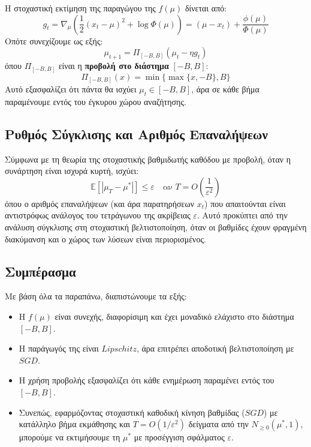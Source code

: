 \documentclass[12pt]{article}
\begin{document}
Η στοχαστική εκτίμηση της παραγώγου της $f(\mu)$ δίνεται από:
\[
g_t = \nabla_\mu \left( \frac{1}{2}(x_t - \mu)^2 + \log \Phi(\mu) \right) = (\mu - x_t) + \frac{\phi(\mu)}{\Phi(\mu)}
\]
Οπότε συνεχίζουμε ως εξής:
\[
\mu_{t+1} = \Pi_{[-B,B]}\left( \mu_t - \eta g_t \right)
\]
όπου $\Pi_{[-B,B]}$ είναι η \textbf{προβολή στο διάστημα} $[-B, B]$:
\[
\Pi_{[-B,B]}(x) = \min\{\max\{x, -B\}, B\}
\]
Αυτό εξασφαλίζει ότι πάντα θα ισχύει $\mu_t \in [-B,B]$, άρα σε κάθε βήμα παραμένουμε εντός του έγκυρου χώρου αναζήτησης.

\subsection*{Ρυθμός Σύγκλισης και Αριθμός Επαναλήψεων}

Σύμφωνα με τη θεωρία της στοχαστικής βαθμιδωτής καθόδου με προβολή, όταν η συνάρτηση είναι ισχυρά κυρτή, ισχύει: 
\[
\mathbb{E}[|\mu_T - \mu^*|] \leq \varepsilon \quad \text{αν } T = O\left( \frac{1}{\varepsilon^2} \right)
\]
όπου ο αριθμός επαναλήψεων (και άρα παρατηρήσεων $x_t$) που απαιτούνται είναι αντιστρόφως ανάλογος του τετράγωνου της ακρίβειας $\varepsilon$. Αυτό προκύπτει από την ανάλυση σύγκλισης στη στοχαστική βελτιστοποίηση, όταν οι βαθμίδες έχουν φραγμένη διακύμανση και ο χώρος των λύσεων είναι περιορισμένος.

\subsection*{Συμπέρασμα}

Με βάση όλα τα παραπάνω, διαπιστώνουμε τα εξής:
\begin{itemize}
  \item Η $f(\mu)$ είναι συνεχής, διαφορίσιμη και έχει μοναδικό ελάχιστο στο διάστημα $[-B,B]$.
  \item Η παράγωγός της είναι $Lipschitz$, άρα επιτρέπει αποδοτική βελτιστοποίηση με $SGD$.
  \item Η χρήση προβολής εξασφαλίζει ότι κάθε ενημέρωση παραμένει εντός του $[-B, B]$.
  \item Συνεπώς, εφαρμόζοντας στοχαστική καθοδική κίνηση βαθμίδας ($SGD$) με κατάλληλο βήμα εκμάθησης και $T = O(1/\varepsilon^2)$ δείγματα από την $N_{\geq 0}(\mu^*, 1)$, μπορούμε να εκτιμήσουμε τη $\mu^*$ με προσέγγιση σφάλματος $\varepsilon$.
\end{itemize}
\end{document}
